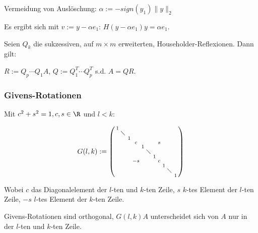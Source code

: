 Vermeidung von Auslöschung: $\alpha := -sign(y_1)\|y\|_2$

Es ergibt sich mit $v:=y-\alpha e_1$: $H(y-\alpha e_1)y=\alpha e_1$.

\vspace{1mm}

Seien $Q_k$ die sukzessiven, auf $m \times m$ erweiterten, Householder-Reflexionen. Dann gilt:

\vspace{1mm}

$R:=Q_p \cdots Q_1 A$, $Q:=Q_1^T \cdots Q_p^T$ s.d. $A=QR$.

\subsubsection*{Givens-Rotationen}

Mit $c^2 + s^2 = 1, c, s \in \R$ und $l < k$:

$$G(l,k) := \left(\begin{smallmatrix}
1 &           &   &    &   &           &   &   &   &           &   \\
  & \diagdown &   &    &   &           &   &   &   &           &   \\
  &           & 1 &    &   &           &   &   &   &           &   \\
  &           &   &  c &   &           &   & s &   &           &   \\
  &           &   &    & 1 &           &   &   &   &           &   \\
  &           &   &    &   & \diagdown &   &   &   &           &   \\
  &           &   &    &   &           & 1 &   &   &           &   \\
  &           &   & -s &   &           &   & c &   &           &   \\
  &           &   &    &   &           &   &   & 1 &           &   \\
  &           &   &    &   &           &   &   &   & \diagdown &   \\
  &           &   &    &   &           &   &   &   &           & 1
\end{smallmatrix}\right)$$

Wobei $c$ das Diagonalelement der $l$-ten und $k$-ten Zeile, $s$ $k$-tes Element der $l$-ten Zeile, $-s$ $l$-tes Element der $k$-ten Zeile.

Givens-Rotationen sind orthogonal, $G(l,k)A$ unterscheidet sich von $A$ nur in der $l$-ten und $k$-ten Zeile.

